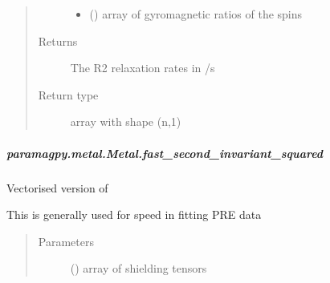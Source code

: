 \documentclass[a4paper,10pt,english]{sphinxmanual}
\begin{document}
\begin{fulllineitems}
\begin{fulllineitems}
\begin{fulllineitems}
\begin{quote}
\begin{description}
\begin{itemize}
\item {} 
 (\sphinxstyleliteralemphasis{\sphinxupquote{ (}}\sphinxstyleliteralemphasis{\sphinxupquote{,}}\sphinxstyleliteralemphasis{\sphinxupquote{)}}) \textendash{} array of gyromagnetic ratios of the spins

\end{itemize}

\item[{Returns}] \leavevmode
{} \textendash{} The R2 relaxation rates in /s

\item[{Return type}] \leavevmode
array with shape (n,1)

\end{description}\end{quote}

\end{fulllineitems}



\subparagraph{paramagpy.metal.Metal.fast\_second\_invariant\_squared}
\label{\detokenize{reference/generated/paramagpy.metal.Metal.fast_second_invariant_squared:paramagpy-metal-metal-fast-second-invariant-squared}}\label{\detokenize{reference/generated/paramagpy.metal.Metal.fast_second_invariant_squared::doc}}

\begin{fulllineitems}
\label{\detokenize{reference/generated/paramagpy.metal.Metal.fast_second_invariant_squared:paramagpy.metal.Metal.fast_second_invariant_squared}}
Vectorised version of
{\hyperref[\detokenize{reference/generated/paramagpy.metal.Metal.second_invariant_squared:paramagpy.metal.Metal.second_invariant_squared}]{}}

This is generally used for speed in fitting PRE data
\begin{quote}\begin{description}
\item[{Parameters}] \leavevmode
{} (\sphinxstyleliteralemphasis{\sphinxupquote{ (}}\sphinxstyleliteralemphasis{\sphinxupquote{,}}\sphinxstyleliteralemphasis{\sphinxupquote{,}}\sphinxstyleliteralemphasis{\sphinxupquote{)}}) \textendash{} array of shielding tensors


\end{description}
\end{quote}
\end{fulllineitems}
\end{fulllineitems}
\end{fulllineitems}
\end{document}
